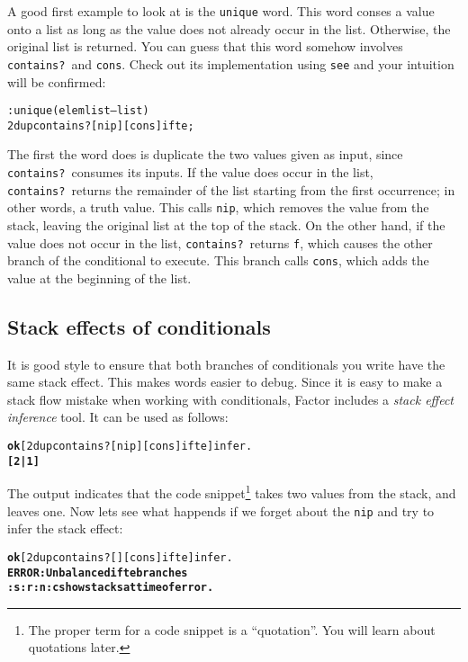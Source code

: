 \documentclass[english]{book}
\begin{document}
A good first example to look at is the \texttt{unique} word. This word conses a value onto a list as long as the value does not already occur in the list. Otherwise, the original list is returned. You can guess that this word somehow involves \texttt{contains?}~and \texttt{cons}. Check out its implementation using \texttt{see} and your intuition will be confirmed:

\begin{alltt}
: unique ( elem list -- list )
    2dup contains? [ nip ] [ cons ] ifte ;
\end{alltt}

The first the word does is duplicate the two values given as input, since \texttt{contains?}~consumes its inputs. If the value does occur in the list, \texttt{contains?}~returns the remainder of the list starting from the first occurrence; in other words, a truth value. This calls \texttt{nip}, which removes the value from the stack, leaving the original list at the top of the stack. On the other hand, if the value does not occur in the list, \texttt{contains?}~returns \texttt{f}, which causes the other branch of the conditional to execute. This branch calls \texttt{cons}, which adds the value at the beginning of the list. 

\subsection{Stack effects of conditionals}

It is good style to ensure that both branches of conditionals you write have the same stack effect. This makes words easier to debug. Since it is easy to make a stack flow mistake when working with conditionals, Factor includes a \emph{stack effect inference} tool. It can be used as follows:

\begin{alltt}
\textbf{ok} [ 2dup contains? [ nip ] [ cons ] ifte ] infer .
\textbf{[ 2 | 1 ]}
\end{alltt}

The output indicates that the code snippet\footnote{The proper term for a code snippet is a ``quotation''. You will learn about quotations later.} takes two values from the stack, and leaves one. Now lets see what happends if we forget about the \texttt{nip} and try to infer the stack effect:

\begin{alltt}
\textbf{ok} [ 2dup contains? [ ] [ cons ] ifte ] infer .
\textbf{ERROR: Unbalanced ifte branches
:s :r :n :c show stacks at time of error.}
\end{alltt}
\end{document}
